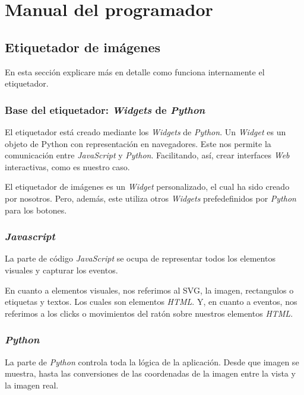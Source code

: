 \section{Manual del programador}

\subsection{Etiquetador de imágenes}

En esta sección explicare más en detalle como funciona internamente el etiquetador.

\subsubsection{Base del etiquetador: \textit{Widgets} de \textit{Python}}

El etiquetador está creado mediante los \textit{Widgets} de \textit{Python}. Un \textit{Widget} es un objeto de Python con representación en navegadores. Este nos permite la comunicación entre \textit{JavaScript} y \textit{Python}. Facilitando, así, crear interfaces \textit{Web} interactivas, como es nuestro caso\cite{ipywidgets:whataarewidgets}.

El etiquetador de imágenes es un \textit{Widget} personalizado, el cual ha sido creado por nosotros. Pero, además, este utiliza otros \textit{Widgets} prefedefinidos por \textit{Python} para los botones.

\subsubsection{\textit{Javascript}}

La parte de código \textit{JavaScript} se ocupa de representar todos los elementos visuales y capturar los eventos.

En cuanto a elementos visuales, nos referimos al SVG, la imagen, rectangulos o etiquetas y textos. Los cuales son elementos \textit{HTML}. Y, en cuanto a eventos, nos referimos a los clicks o movimientos del ratón sobre nuestros elementos \textit{HTML}.

\subsubsection{\textit{Python}}

La parte de \textit{Python} controla toda la lógica de la aplicación. Desde que imagen se muestra, hasta las conversiones de las coordenadas de la imagen entre la vista y la imagen real.

